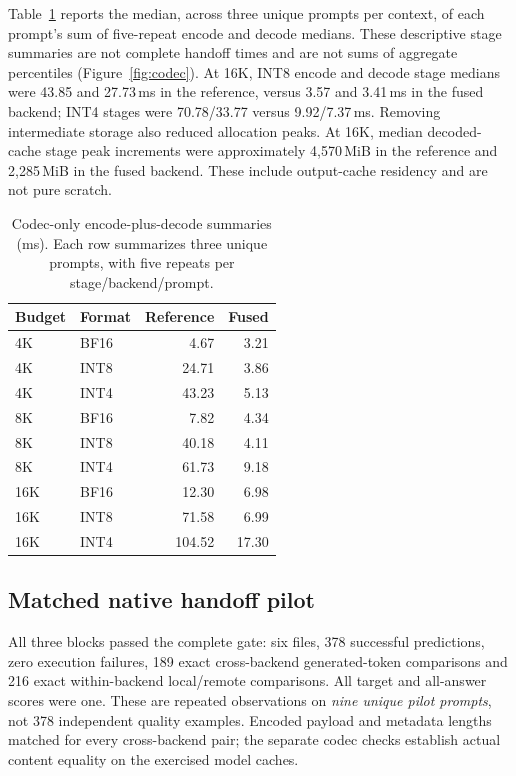 \documentclass[10pt,twocolumn,letterpaper]{article}
\begin{document}
Table~\ref{tab:codec} reports the median, across three unique prompts per
context, of each prompt's sum of five-repeat encode and decode medians.
These descriptive stage summaries are not complete handoff times and are not
sums of aggregate percentiles (Figure~\ref{fig:codec}). At 16K, INT8 encode
and decode stage medians were 43.85 and 27.73\,ms in the reference, versus
3.57 and 3.41\,ms in the fused backend; INT4 stages were 70.78/33.77 versus
9.92/7.37\,ms. Removing intermediate storage also reduced allocation peaks.
At 16K, median decoded-cache stage peak increments were approximately
4,570\,MiB in the reference and 2,285\,MiB in the fused backend. These include
output-cache residency and are not pure scratch.

\begin{table}[t]
\centering\small
\caption{Codec-only encode-plus-decode summaries (ms). Each row summarizes
three unique prompts, with five repeats per stage/backend/prompt.}
\label{tab:codec}
\setlength{\tabcolsep}{5pt}
\begin{tabular}{llrr}
\toprule Budget & Format & Reference & Fused \\
\midrule
4K & BF16 & 4.67 & 3.21 \\
4K & INT8 & 24.71 & 3.86 \\
4K & INT4 & 43.23 & 5.13 \\
8K & BF16 & 7.82 & 4.34 \\
8K & INT8 & 40.18 & 4.11 \\
8K & INT4 & 61.73 & 9.18 \\
16K & BF16 & 12.30 & 6.98 \\
16K & INT8 & 71.58 & 6.99 \\
16K & INT4 & 104.52 & 17.30 \\
\bottomrule
\end{tabular}
\end{table}


\subsection{Matched native handoff pilot}
All three blocks passed the complete gate: six files, 378 successful
predictions, zero execution failures, 189 exact cross-backend generated-token
comparisons and 216 exact within-backend local/remote comparisons. All target
and all-answer scores were one. These are repeated observations on \emph{nine
unique pilot prompts}, not 378 independent quality examples. Encoded payload
and metadata lengths matched for every cross-backend pair; the separate codec
checks establish actual content equality on the exercised model caches.
\end{document}
